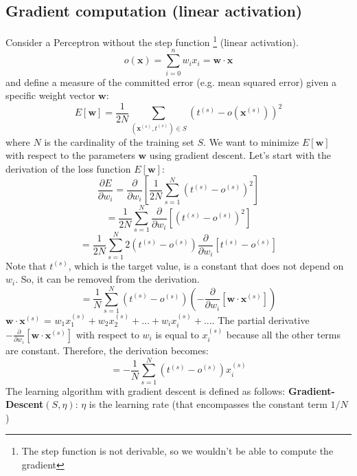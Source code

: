 \subsection{Gradient computation (linear activation)}
Consider a Perceptron without the step function \footnote{The step function is not derivable, so we wouldn't be able to compute the gradient} (linear activation).
\[o(\textbf{x}) = \sum_{i=0}^{n}w_{i}x_{i} = \textbf{w} \cdot \textbf{x}\]
and define a measure of the committed error (e.g. mean squared error) given a specific weight vector $\textbf{w}$:
\[E[\textbf{w}] = \frac{1}{2N} \sum_{(\textbf{x}^{(s)}, t^{(s)}) \in S} (t^{(s)} - o(\textbf{x}^{(s)}))^{2}\]
where $N$ is the cardinality of the training set $S$. We want to minimize $E[\textbf{w}]$ with respect to the parameters $\textbf{w}$ using gradient descent. Let's start with the derivation of the loss function $E[\textbf{w}]$:
\[\frac{\partial E}{\partial w_{i}} = \frac{\partial}{\partial w_{i}}\left[\frac{1}{2N}\sum_{s=1}^{N}(t^{(s)} - o^{(s)})^{2} \right]\]
\[= \frac{1}{2N} \sum_{s=1}^{N}\frac{\partial}{\partial w_{i}}\left[ (t^{(s)} - o^{(s)})^{2} \right]\]
\[= \frac{1}{2N}\sum_{s=1}^{N}2(t^{(s)} - o^{(s)})\frac{\partial}{\partial w_{i}}\left[ t^{(s)} - o^{(s)}\right]\]
Note that $t^{(s)}$, which is the target value, is a constant that does not depend on $w_{i}$. So, it can be removed from the derivation.
\[= \frac{1}{N} \sum_{s=1}^{N}(t^{(s)} - o^{(s)})\left(-\frac{\partial}{\partial w_{i}}\left[\textbf{w} \cdot \textbf{x}^{(s)}\right]\right)\]
$\textbf{w} \cdot \textbf{x}^{(s)}$ = $w_{1}x_{1}^{(s)} + w_{2}x_{2}^{(s)} + ... + w_{i}x_{i}^{(s)} + ...$. The partial derivative $-\frac{\partial}{\partial w_{i}}\left[\textbf{w} \cdot \textbf{x}^{(s)}\right]$ with respect to  $w_{i}$ is equal to $x_{i}^{(s)}$ because all the other terms are constant. Therefore, the derivation becomes:
\[ = -\frac{1}{N}\sum_{s=1}^{N}(t^{(s)} - o^{(s)})x_{i}^{(s)}\]
The learning algorithm with gradient descent is defined as follows:\newline\newline
\textbf{Gradient-Descent$(S,\eta)$}:\newline
$\eta$ is the learning rate (that encompasses the constant term $1/N$)
